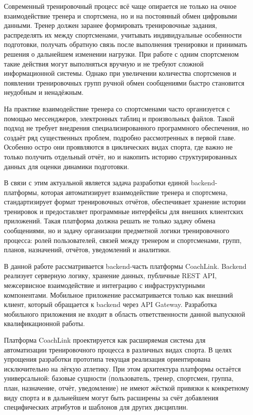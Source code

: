 \introduction

Современный тренировочный процесс всё чаще опирается не только на очное взаимодействие тренера и спортсмена, но и на постоянный обмен цифровыми данными. Тренер должен заранее формировать тренировочные задания, распределять их между спортсменами, учитывать индивидуальные особенности подготовки, получать обратную связь после выполнения тренировки и принимать решения о дальнейшем изменении нагрузки. При работе с одним спортсменом такие действия могут выполняться вручную и не требуют сложной информационной системы. Однако при увеличении количества спортсменов и появлении тренировочных групп ручной обмен сообщениями быстро становится неудобным и ненадёжным.

На практике взаимодействие тренера со спортсменами часто организуется с помощью мессенджеров, электронных таблиц и произвольных файлов. Такой подход не требует внедрения специализированного программного обеспечения, но создаёт ряд существенных проблем, подробно рассмотренных в первой главе. Особенно остро они проявляются в циклических видах спорта, где важно не только получить отдельный отчёт, но и накопить историю структурированных данных для оценки динамики подготовки.

В связи с этим актуальной является задача разработки единой backend-платформы, которая автоматизирует взаимодействие тренера и спортсмена, стандартизирует формат тренировочных отчётов, обеспечивает хранение истории тренировок и предоставляет программные интерфейсы для внешних клиентских приложений. Такая платформа должна решать не только задачу обмена сообщениями, но и задачу организации предметной логики тренировочного процесса: ролей пользователей, связей между тренером и спортсменами, групп, планов, назначений, отчётов, уведомлений и аналитики.

В данной работе рассматривается backend-часть платформы CoachLink. Backend реализует серверную логику, хранение данных, публичные REST API, межсервисное взаимодействие и интеграцию с инфраструктурными компонентами. Мобильное приложение рассматривается только как внешний клиент, который обращается к backend через API Gateway. Разработка мобильного приложения не входит в область ответственности данной выпускной квалификационной работы.

Платформа CoachLink проектируется как расширяемая система для автоматизации тренировочного процесса в различных видах спорта. В целях упрощения разработки прототипа текущая реализация ориентирована исключительно на лёгкую атлетику. При этом архитектура платформы остаётся универсальной: базовые сущности (пользователь, тренер, спортсмен, группа, план, назначение, отчёт, уведомление) не имеют жёсткой привязки к конкретному виду спорта и в дальнейшем могут быть расширены за счёт добавления специфических атрибутов и шаблонов для других дисциплин.

